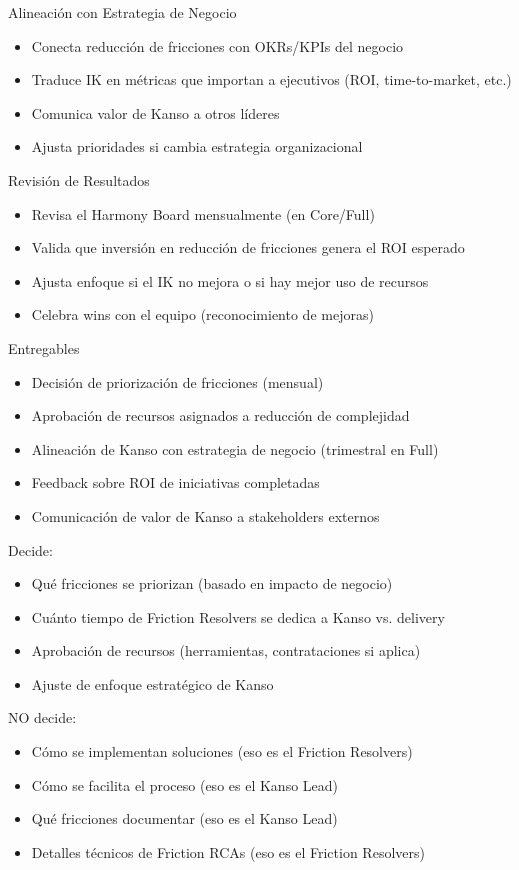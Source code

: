 Alineación con Estrategia de Negocio
\begin{itemize}
    \item Conecta reducción de fricciones con OKRs/KPIs del negocio
    \item Traduce IK en métricas que importan a ejecutivos (ROI, time-to-market, etc.)
    \item Comunica valor de Kanso a otros líderes
    \item Ajusta prioridades si cambia estrategia organizacional
\end{itemize}

Revisión de Resultados
\begin{itemize}
    \item Revisa el Harmony Board mensualmente (en Core/Full)
    \item Valida que inversión en reducción de fricciones genera el ROI esperado
    \item Ajusta enfoque si el IK no mejora o si hay mejor uso de recursos
    \item Celebra wins con el equipo (reconocimiento de mejoras)
\end{itemize}

Entregables
\begin{itemize}
    \item Decisión de priorización de fricciones (mensual)
    \item Aprobación de recursos asignados a reducción de complejidad
    \item Alineación de Kanso con estrategia de negocio (trimestral en Full)
    \item Feedback sobre ROI de iniciativas completadas
    \item Comunicación de valor de Kanso a stakeholders externos
\end{itemize}

Decide:
\begin{itemize}
    \item Qué fricciones se priorizan (basado en impacto de negocio)
    \item Cuánto tiempo de Friction Resolvers se dedica a Kanso vs. delivery
    \item Aprobación de recursos (herramientas, contrataciones si aplica)
    \item Ajuste de enfoque estratégico de Kanso
\end{itemize}

NO decide:
\begin{itemize}
    \item Cómo se implementan soluciones (eso es el Friction Resolvers)
    \item Cómo se facilita el proceso (eso es el Kanso Lead)
    \item Qué fricciones documentar (eso es el Kanso Lead)
    \item Detalles técnicos de Friction RCAs (eso es el Friction Resolvers)
\end{itemize}

